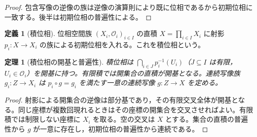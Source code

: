 \documentclass[a5paper,10pt,dvipdfmx]{jsarticle}
\theoremstyle{definition}
\newtheorem{defn}[ruledef]{定義}
\theoremstyle{plain}
\newtheorem{thm}[ruledef]{定理}
\begin{document}
\begin{proof}
包含写像の逆像の族は逆像の演算則により既に位相であるから初期位相に一致する。後半は初期位相の普遍性による。
\end{proof}
\begin{defn}[積位相]\label{k256}
位相空間族 $(X_i,\mathcal O_i)_{i\in I}$ の直積 $X=\prod_{i\in I}X_i$ に射影 $p_i\colon X\to X_i$ の族による初期位相を入れる。これを積位相という。
\end{defn}
\begin{thm}[積位相の開基と普遍性]\label{k257}
積位相は $\bigcap_{i\in J}p_i^{-1}(U_i)$（$J\subseteq I$ は有限，$U_i\in\mathcal O_i$）を開基に持つ。有限積では開集合の直積が開基となる。連続写像族 $g_i\colon Z\to X_i$ は $p_i\circ g=g_i$ を満たす一意の連続写像 $g\colon Z\to X$ を定める。
\end{thm}
\begin{proof}
射影による開集合の逆像は部分基であり，その有限交叉全体が開基となる。同じ座標が複数回現れるときはその座標の開集合を交叉させればよい。有限積では制限しない座標に $X_i$ を取る。空の交叉は $X$ とする。集合の直積の普遍性から $g$ が一意に存在し，初期位相の普遍性から連続である。
\end{proof}

\end{document}
